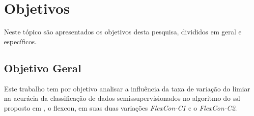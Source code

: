 \section{Objetivos}
    \label{sec:objetivos}

    Neste tópico são apresentados os objetivos desta pesquisa, divididos em geral e específicos.

    \subsection{Objetivo Geral}
        \label{subsec:objetivo-geral}





        Este trabalho tem por objetivo analisar a influência da taxa de variação do limiar na acurácia da classificação de dados semissupervisionados no algoritmo do \ac{ssl} proposto em \citeauthor{vale2018selftraining}, o \ac{flexcon}, em suas duas variações \textit{FlexCon\hyp{C1}} e o \textit{FlexCon\hyp{C2}}.

